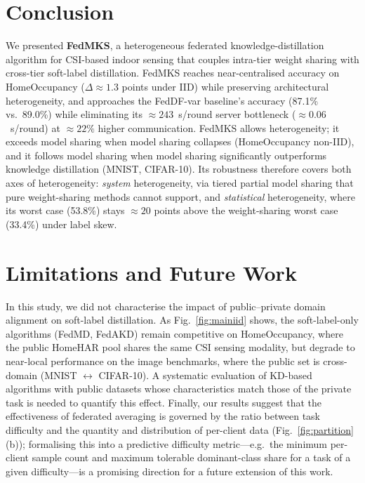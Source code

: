 \documentclass[conference]{IEEEtran}
\begin{document}
\section{Conclusion}
\label{sec:conclusion}

We presented \textbf{FedMKS}, a heterogeneous federated
knowledge-distillation algorithm for CSI-based indoor sensing that couples
intra-tier weight sharing with cross-tier soft-label distillation.  FedMKS
reaches near-centralised accuracy on HomeOccupancy
($\Delta{\approx}1.3$ points under IID) while preserving architectural
heterogeneity, and approaches the FedDF-var baseline's accuracy
(87.1\% vs.\ 89.0\%) while
eliminating its ${\approx}243$~s/round server bottleneck
(${\approx}0.06$~s/round) at ${\approx}22\%$ higher communication.
FedMKS allows heterogeneity; it exceeds model sharing when model sharing
collapses (HomeOccupancy non-IID), and it follows model sharing when
model sharing significantly outperforms knowledge distillation (MNIST,
CIFAR-10).  Its robustness therefore covers both axes of heterogeneity:
\emph{system} heterogeneity, via tiered partial model sharing that pure
weight-sharing methods cannot support, and \emph{statistical}
heterogeneity, where its worst case (53.8\%) stays ${\approx}20$ points
above the weight-sharing worst case (33.4\%) under label skew.

\section{Limitations and Future Work}
\label{sec:limitations}

In this study, we did not characterise the impact of
public--private domain alignment on soft-label distillation.  As Fig.~\ref{fig:mainiid} shows, the soft-label-only algorithms (FedMD, FedAKD) remain competitive
on HomeOccupancy, where the public HomeHAR pool shares the same CSI
sensing modality, but degrade to near-local performance on the image
benchmarks, where the public set is cross-domain
(MNIST $\leftrightarrow$ CIFAR-10).  A systematic evaluation of KD-based
algorithms with public datasets whose characteristics match those of the
private task is needed to quantify this effect.
Finally, our results suggest that the effectiveness of federated
averaging is governed by the ratio between task difficulty and the
quantity and distribution of per-client data
(Fig.~\ref{fig:partition}(b)); formalising this into a predictive
difficulty metric---e.g.\ the minimum per-client sample count and
maximum tolerable dominant-class share for a task of a given
difficulty---is a promising direction for a future extension of this
work.
\end{document}

